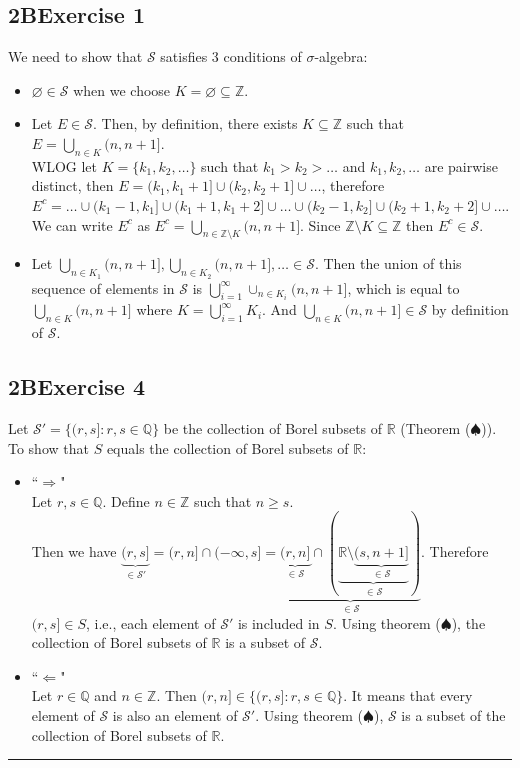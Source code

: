 \documentclass[12pt, letterpaper]{article}
\newcommand{\Z}{\mathbb{Z}}
\newcommand{\R}{\mathbb{R}}
\renewcommand{\S}{\mathcal{S}}
\begin{document}
\subsection*{2\hspace{1pt}B\hspace{20pt}Exercise 1 }
We need to show that $\S$ satisfies 3 conditions of $\sigma$-algebra:
\begin{itemize}
    \item $\varnothing\in \S$ when we choose $K=\varnothing\subseteq\Z$.
    
    \item Let $E\in\S$. Then, by definition, there exists $K\subseteq \Z$ such that $E=\bigcup_{n\in K}(n, n+1]$.\\
    WLOG let $K=\{k_1,k_2,\dots\}$ such that $k_1>k_2>\dots$ and $k_1, k_2, \dots$ are pairwise distinct, then $E=(k_1,k_1+1]\cup(k_2,k_2+1]\cup\dots$, therefore $E^c=\dots\cup(k_1-1,k_1]\cup(k_1+1,k_1+2]\cup\dots\cup(k_2-1,k_2]\cup(k_2+1,k_2+2]\cup\dots$.\\
    We can write $E^c$ as $E^c=\bigcup_{n\in \Z\setminus K}(n, n+1]$. Since $\Z\setminus K\subseteq\Z$ then $E^c\in\S$.
    
    \item Let $\bigcup_{n\in K_1}(n, n+1],\bigcup_{n\in K_2}(n, n+1],\dots\in\S$. Then the union of this sequence of elements in $\S$ is  $\bigcup_{i=1}^\infty\cup_{n\in K_i}(n, n+1]$, which is equal to $\bigcup_{n\in K}(n, n+1]$ where $K=\bigcup_{i=1}^\infty K_i$. And $\bigcup_{n\in K}(n, n+1]\in\S$ by definition of $\S$.
\end{itemize}
\clearpage

\subsection*{2\hspace{1pt}B\hspace{20pt}Exercise 4}
Let $\S'=\{(r,s]: r,s\in \mathbb{Q}\}$ be the collection of Borel subsets of $\R$ (Theorem ($\spadesuit$)).\\
To show that $S$ equals the collection of Borel subsets of $\R$:
\begin{itemize}[label={}]
    \item``$\bm{\Rightarrow}$"\\
    Let $r,s\in\mathbb{Q}$. Define $n\in\Z$ such that $n\geq s$.\\
    Then we have $\underbrace{(r,s]}_{\in \S'}=(r,n]\cap(-\infty,s]=\underbrace{\underbrace{(r,n]}_{\in\S}\cap(\underbrace{\R\setminus\underbrace{(s,n+1]}_{\in\S}}_{\in\S})}_{\in\S}$. Therefore $(r,s]\in S$, i.e., each element of $\S'$ is included in $S$. 
    Using theorem ($\spadesuit$), the collection of Borel subsets of $\R$ is a subset of $\S$.

    \item``$\bm{\Leftarrow}$"\\
    Let $r\in\mathbb{Q}$ and $n\in\Z$. Then $(r,n]\in\{(r,s]: r,s\in \mathbb{Q}\}$. 
    It means that every element of $\S$ is also an element of $\S'$. Using theorem ($\spadesuit$), $\S$ is a subset of the collection of Borel subsets of $\R$.\\
\end{itemize}
\hrule
\end{document}
